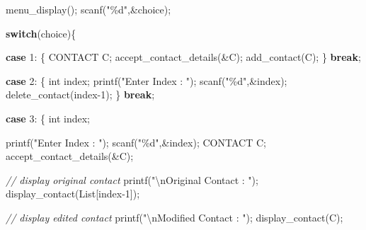 \documentclass[
]{article}
\newenvironment{Shaded}{}{}
\newcommand{\CommentTok}[1]{\textcolor[rgb]{0.38,0.63,0.69}{\textit{#1}}}
\newcommand{\ControlFlowTok}[1]{\textcolor[rgb]{0.00,0.44,0.13}{\textbf{#1}}}
\newcommand{\DataTypeTok}[1]{\textcolor[rgb]{0.56,0.13,0.00}{#1}}
\newcommand{\DecValTok}[1]{\textcolor[rgb]{0.25,0.63,0.44}{#1}}
\newcommand{\NormalTok}[1]{#1}
\newcommand{\OperatorTok}[1]{\textcolor[rgb]{0.40,0.40,0.40}{#1}}
\newcommand{\SpecialCharTok}[1]{\textcolor[rgb]{0.25,0.44,0.63}{#1}}
\newcommand{\StringTok}[1]{\textcolor[rgb]{0.25,0.44,0.63}{#1}}
\begin{document}
\begin{Shaded}
\begin{Highlighting}[]
\NormalTok{        menu\_display}\OperatorTok{();}
\NormalTok{        scanf}\OperatorTok{(}\StringTok{"\%d"}\OperatorTok{,\&}\NormalTok{choice}\OperatorTok{);}

        \ControlFlowTok{switch}\OperatorTok{(}\NormalTok{choice}\OperatorTok{)\{}

            \ControlFlowTok{case} \DecValTok{1}\OperatorTok{:} \OperatorTok{\{}
\NormalTok{                        CONTACT C}\OperatorTok{;}
\NormalTok{                        accept\_contact\_details}\OperatorTok{(\&}\NormalTok{C}\OperatorTok{);}
\NormalTok{                        add\_contact}\OperatorTok{(}\NormalTok{C}\OperatorTok{);}
                    \OperatorTok{\}}
                    \ControlFlowTok{break}\OperatorTok{;}

            \ControlFlowTok{case} \DecValTok{2}\OperatorTok{:} \OperatorTok{\{}
                        \DataTypeTok{int}\NormalTok{ index}\OperatorTok{;}
\NormalTok{                        printf}\OperatorTok{(}\StringTok{"Enter Index : "}\OperatorTok{);}
\NormalTok{                        scanf}\OperatorTok{(}\StringTok{"\%d"}\OperatorTok{,\&}\NormalTok{index}\OperatorTok{);}
\NormalTok{                        delete\_contact}\OperatorTok{(}\NormalTok{index}\OperatorTok{{-}}\DecValTok{1}\OperatorTok{);}
                    \OperatorTok{\}}
                    \ControlFlowTok{break}\OperatorTok{;}

            \ControlFlowTok{case} \DecValTok{3}\OperatorTok{:} \OperatorTok{\{}
                        \DataTypeTok{int}\NormalTok{ index}\OperatorTok{;}

\NormalTok{                        printf}\OperatorTok{(}\StringTok{"Enter Index : "}\OperatorTok{);}
\NormalTok{                        scanf}\OperatorTok{(}\StringTok{"\%d"}\OperatorTok{,\&}\NormalTok{index}\OperatorTok{);}
\NormalTok{                        CONTACT C}\OperatorTok{;}
\NormalTok{                        accept\_contact\_details}\OperatorTok{(\&}\NormalTok{C}\OperatorTok{);}

                        \CommentTok{// display original contact}
\NormalTok{                        printf}\OperatorTok{(}\StringTok{"}\SpecialCharTok{\textbackslash{}n}\StringTok{Original Contact : "}\OperatorTok{);}
\NormalTok{                        display\_contact}\OperatorTok{(}\NormalTok{List}\OperatorTok{[}\NormalTok{index}\OperatorTok{{-}}\DecValTok{1}\OperatorTok{]);}

                        \CommentTok{// display edited contact}
\NormalTok{                        printf}\OperatorTok{(}\StringTok{"}\SpecialCharTok{\textbackslash{}n}\StringTok{Modified Contact : "}\OperatorTok{);}
\NormalTok{                        display\_contact}\OperatorTok{(}\NormalTok{C}\OperatorTok{);}


\end{Highlighting}
\end{Shaded}
\end{document}
